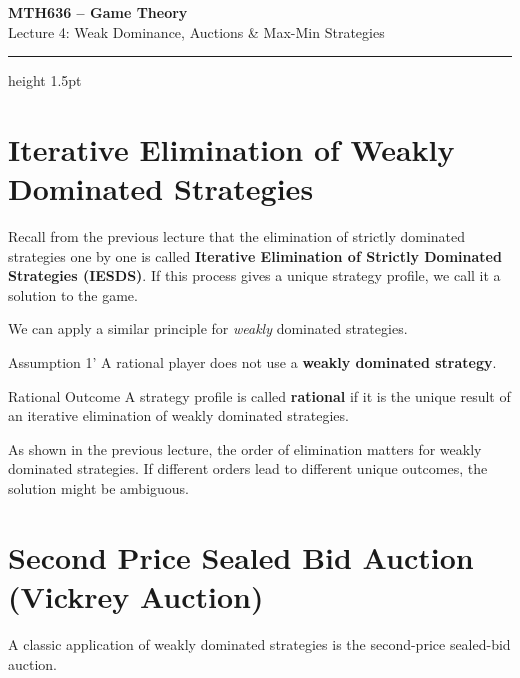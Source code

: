 \documentclass[12pt, a4paper]{article}
\begin{document}
\begin{center}
  {\LARGE\bfseries\sffamily\color{defblue} MTH636 -- Game Theory}\\[6pt]
  {\Large\sffamily Lecture 4: Weak Dominance, Auctions \& Max-Min Strategies}\\[4pt]
\end{center}
\vspace{0.5cm}
\hrule height 1.5pt
\vspace{0.3cm}

\section{Iterative Elimination of Weakly Dominated Strategies}

Recall from the previous lecture that the elimination of strictly dominated strategies one by one is called \textbf{Iterative Elimination of Strictly Dominated Strategies (IESDS)}. If this process gives a unique strategy profile, we call it a solution to the game.

We can apply a similar principle for \emph{weakly} dominated strategies.

\begin{warnbox}{Assumption 1'}
  A rational player does not use a \textbf{weakly dominated strategy}.
\end{warnbox}

\begin{defbox}{Rational Outcome}
  A strategy profile is called \textbf{rational} if it is the unique result of an iterative elimination of weakly dominated strategies.
\end{defbox}

\begin{notebox}
  As shown in the previous lecture, the order of elimination matters for weakly dominated strategies. If different orders lead to different unique outcomes, the solution might be ambiguous.
\end{notebox}

\section{Second Price Sealed Bid Auction (Vickrey Auction)}

A classic application of weakly dominated strategies is the second-price sealed-bid auction.
\end{document}
